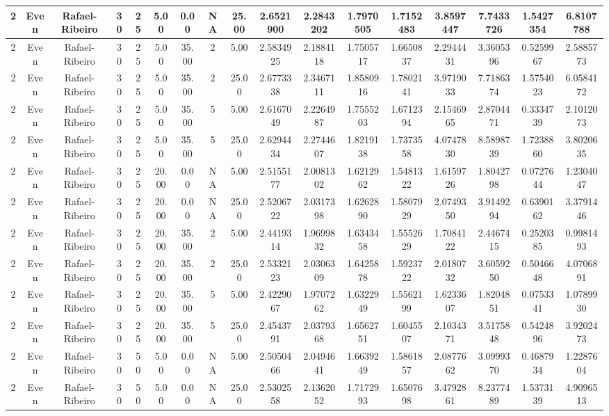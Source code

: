 \begin{longtable}{ | c | c | c | c | c | c | c | c | c | c | c | c | c | c | c | c | c | }
	\hline
	2	&	Even	&	Rafael-Ribeiro	&	30	&	25	&	5.00	&	0.00	&	NA	&	25.00	&	2.6521900	&	2.2843202	&	1.7970505	&	1.7152483	&	3.8597447	&	7.7433726	&	1.5427354	&	6.8107788 \\
	\hline
	2	&	Even	&	Rafael-Ribeiro	&	30	&	25	&	5.00	&	35.00	&	2	&	5.00	&	2.5834925	&	2.1884118	&	1.7505717	&	1.6650837	&	2.2944431	&	3.3605396	&	0.5259967	&	2.5885773 \\
	\hline
	2	&	Even	&	Rafael-Ribeiro	&	30	&	25	&	5.00	&	35.00	&	2	&	25.00	&	2.6773338	&	2.3467111	&	1.8580916	&	1.7802141	&	3.9719033	&	7.7186374	&	1.5754023	&	6.0584172 \\
	\hline
	2	&	Even	&	Rafael-Ribeiro	&	30	&	25	&	5.00	&	35.00	&	5	&	5.00	&	2.6167049	&	2.2264987	&	1.7555203	&	1.6712394	&	2.1546965	&	2.8704471	&	0.3334739	&	2.1012073 \\
	\hline
	2	&	Even	&	Rafael-Ribeiro	&	30	&	25	&	5.00	&	35.00	&	5	&	25.00	&	2.6294434	&	2.2744607	&	1.8219138	&	1.7373558	&	4.0747830	&	8.5898739	&	1.7238860	&	3.8020635 \\
	\hline
	2	&	Even	&	Rafael-Ribeiro	&	30	&	25	&	20.00	&	0.00	&	NA	&	5.00	&	2.5155177	&	2.0081302	&	1.6212962	&	1.5481322	&	1.6159726	&	1.8042798	&	0.0727644	&	1.2304047 \\
	\hline
	2	&	Even	&	Rafael-Ribeiro	&	30	&	25	&	20.00	&	0.00	&	NA	&	25.00	&	2.5206722	&	2.0317398	&	1.6262890	&	1.5807929	&	2.0749350	&	3.9149294	&	0.6390162	&	3.3791446 \\
	\hline
	2	&	Even	&	Rafael-Ribeiro	&	30	&	25	&	20.00	&	35.00	&	2	&	5.00	&	2.4419314	&	1.9699832	&	1.6343458	&	1.5552629	&	1.7084122	&	2.4467415	&	0.2520385	&	0.9981493 \\
	\hline
	2	&	Even	&	Rafael-Ribeiro	&	30	&	25	&	20.00	&	35.00	&	2	&	25.00	&	2.5332123	&	2.0306309	&	1.6425878	&	1.5923722	&	2.0180732	&	3.6059250	&	0.5046648	&	4.0706891 \\
	\hline
	2	&	Even	&	Rafael-Ribeiro	&	30	&	25	&	20.00	&	35.00	&	5	&	5.00	&	2.4229067	&	1.9707262	&	1.6322949	&	1.5562199	&	1.6233607	&	1.8204851	&	0.0753341	&	1.0789930 \\
	\hline
	2	&	Even	&	Rafael-Ribeiro	&	30	&	25	&	20.00	&	35.00	&	5	&	25.00	&	2.4543791	&	2.0379368	&	1.6562751	&	1.6045507	&	2.1034371	&	3.5175848	&	0.5424896	&	3.9202473 \\
	\hline
	2	&	Even	&	Rafael-Ribeiro	&	30	&	50	&	5.00	&	0.00	&	NA	&	5.00	&	2.5050466	&	2.0494641	&	1.6639249	&	1.5861857	&	2.0877662	&	3.0999370	&	0.4687934	&	1.2287604 \\
	\hline
	2	&	Even	&	Rafael-Ribeiro	&	30	&	50	&	5.00	&	0.00	&	NA	&	25.00	&	2.5302558	&	2.1362052	&	1.7172993	&	1.6507698	&	3.4792861	&	8.2377489	&	1.5373139	&	4.9096513 \\

\end{longtable}
